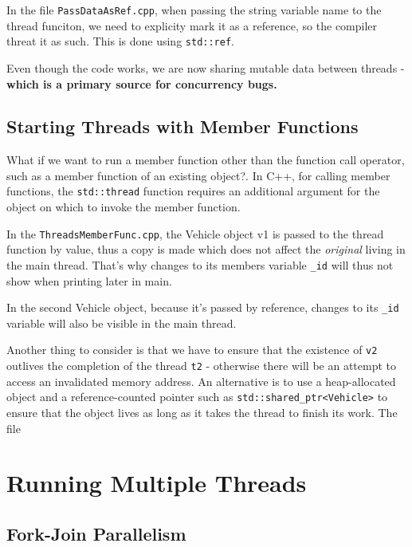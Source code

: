 \documentclass[11pt, a4paper]{article}
\begin{document}
In the file \texttt{PassDataAsRef.cpp}, when passing the string variable name to the thread funciton, we need to explicity mark it as a reference, so the compiler threat it as such. This is done using \texttt{std::ref}.


Even though the code works, we are now sharing mutable data between threads - \textbf{which is a primary source for concurrency bugs.}

\subsection{Starting Threads with Member Functions}%
\label{sub:starting_threads_with_member_functions}



What if we want to run a member function other than the function call operator, such as a member function of an existing object?. In C++, for calling member functions, the \texttt{std::thread} function requires an additional argument for the object on which to invoke the member function.


In the \texttt{ThreadsMemberFunc.cpp}, the Vehicle object v1 is passed to the thread function by value, thus a copy is made which does not affect the \textit{original} living in the main thread. That's why changes to its members variable \texttt{\_id} will thus not show when printing later in main. 

In the second Vehicle object, because it's passed by reference, changes to its \texttt{\_id} variable will also be visible in the main thread. 


Another thing to consider is that we have to ensure that the existence of \texttt{v2} outlives the completion of the thread \texttt{t2} - otherwise there will be an attempt to access an invalidated memory address. An alternative is to use a heap-allocated object and a reference-counted pointer such as \texttt{std::shared\_ptr<Vehicle>} to ensure that the object lives as long as it takes the thread to finish its work. The file 



\section{Running Multiple Threads}%
\label{sec:running_multiple_threads}


\subsection{Fork-Join Parallelism}%
\label{sub:fork_join_parallelism}
\end{document}

